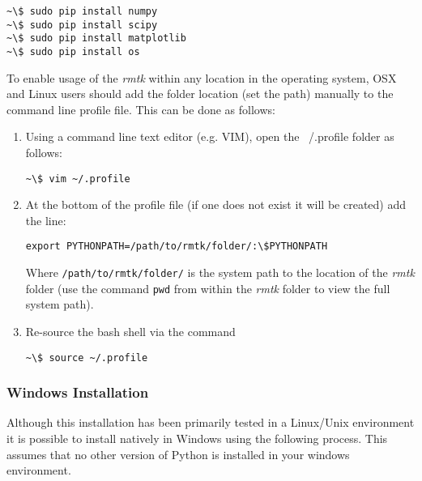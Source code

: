 \begin{Verbatim}[frame=single, commandchars=\\\{\}, samepage=true]
~\$ sudo pip install numpy
~\$ sudo pip install scipy
~\$ sudo pip install matplotlib
~\$ sudo pip install os
\end{Verbatim}

To enable usage of the \textit{rmtk} within any location in the operating system, OSX and Linux users should add the folder location (set the path) manually to the command line profile file. This can be done as follows:
\begin{enumerate}
\item Using a command line text editor (e.g. VIM), open the ~/.profile folder as follows:

\begin{Verbatim}[frame=single, commandchars=\\\{\}, samepage=true]
~\$ vim ~/.profile
\end{Verbatim}

\item At the bottom of the profile file (if one does not exist it will be created) add the line:

\begin{Verbatim}[frame=single, commandchars=\\\{\}, samepage=true]
export PYTHONPATH=/path/to/rmtk/folder/:\$PYTHONPATH
\end{Verbatim}

Where \verb=/path/to/rmtk/folder/= is the system path to the location of the \textit{rmtk} folder (use the command \verb=pwd= from within the \textit{rmtk} folder to view the full system path).

\item Re-source the bash shell via the command

\begin{Verbatim}[frame=single, commandchars=\\\{\}, samepage=true]
~\$ source ~/.profile
\end{Verbatim}
 
\end{enumerate}

\subsubsection{Windows Installation}

Although this installation has been primarily tested in a Linux/Unix environment it is possible to install natively in Windows using the following process. This assumes that no other version of Python is installed in your windows environment.

